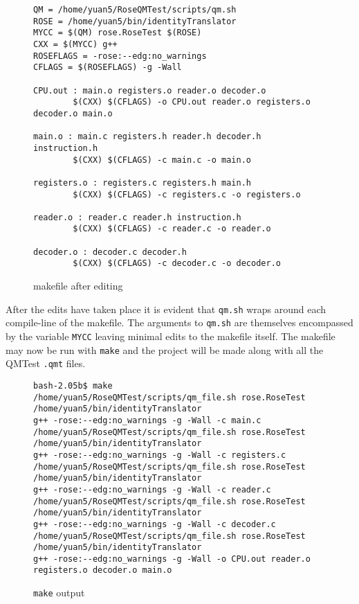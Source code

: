 \begin{figure}[!ht]
{\scriptsize
\begin{verbatim}
QM = /home/yuan5/RoseQMTest/scripts/qm.sh
ROSE = /home/yuan5/bin/identityTranslator
MYCC = $(QM) rose.RoseTest $(ROSE)
CXX = $(MYCC) g++
ROSEFLAGS = -rose:--edg:no_warnings
CFLAGS = $(ROSEFLAGS) -g -Wall
                                                                                
CPU.out : main.o registers.o reader.o decoder.o
        $(CXX) $(CFLAGS) -o CPU.out reader.o registers.o decoder.o main.o
                                                                                
main.o : main.c registers.h reader.h decoder.h instruction.h
        $(CXX) $(CFLAGS) -c main.c -o main.o
                                                                                
registers.o : registers.c registers.h main.h
        $(CXX) $(CFLAGS) -c registers.c -o registers.o
                                                                               
reader.o : reader.c reader.h instruction.h
        $(CXX) $(CFLAGS) -c reader.c -o reader.o
                                                                                
decoder.o : decoder.c decoder.h
        $(CXX) $(CFLAGS) -c decoder.c -o decoder.o
\end{verbatim}
}
\caption{makefile after editing}
\end{figure}

After the edits have taken place it is evident that {\tt qm.sh} wraps around
each compile-line of the makefile. The arguments to {\tt qm.sh} are themselves
encompassed by the variable {\tt MYCC} leaving minimal edits to the makefile
itself. The makefile may now be run with {\tt make} and the project will
be made along with all the QMTest {\tt .qmt} files.

\begin{figure}[!ht]
{\scriptsize
\begin{verbatim}
bash-2.05b$ make
/home/yuan5/RoseQMTest/scripts/qm_file.sh rose.RoseTest /home/yuan5/bin/identityTranslator 
g++ -rose:--edg:no_warnings -g -Wall -c main.c
/home/yuan5/RoseQMTest/scripts/qm_file.sh rose.RoseTest /home/yuan5/bin/identityTranslator 
g++ -rose:--edg:no_warnings -g -Wall -c registers.c
/home/yuan5/RoseQMTest/scripts/qm_file.sh rose.RoseTest /home/yuan5/bin/identityTranslator
g++ -rose:--edg:no_warnings -g -Wall -c reader.c
/home/yuan5/RoseQMTest/scripts/qm_file.sh rose.RoseTest /home/yuan5/bin/identityTranslator 
g++ -rose:--edg:no_warnings -g -Wall -c decoder.c
/home/yuan5/RoseQMTest/scripts/qm_file.sh rose.RoseTest /home/yuan5/bin/identityTranslator 
g++ -rose:--edg:no_warnings -g -Wall -o CPU.out reader.o registers.o decoder.o main.o
\end{verbatim}
}
\caption{{\tt make} output}
\end{figure}

